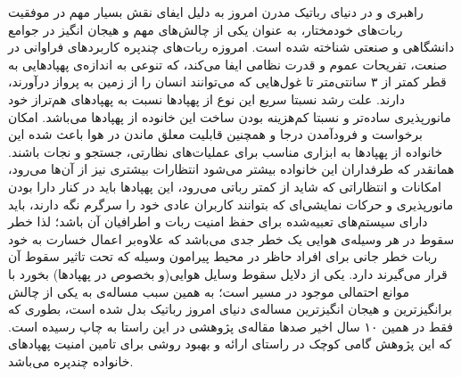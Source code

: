 راهبری و  در دنیای رباتیک مدرن امروز به دلیل ایفای نقش بسیار مهم در موفقیت ربات‌های خودمختار، به عنوان یکی از چالش‌های مهم و هیجان انگیز در جوامع دانشگاهی و صنعتی شناخته شده است. امروزه ربات‌های چندپره کاربردهای فراوانی در صنعت، تفریحات عموم و قدرت نظامی ایفا می‌کند، که تنوعی به اندازه‌ی پهپادهایی به قطر کمتر از ۳ سانتی‌متر تا غول‌هایی که می‌توانند انسان را از زمین به پرواز درآورند، دارند. علت رشد نسبتا سریع این نوع از پهپادها نسبت به پهپادهای هم‌تراز خود مانورپذیری ساده‌تر و نسبتا کم‌هزینه بودن ساخت این خانوده از پهپاد‌ها می‌باشد. امکان برخواست و فرود‌آمدن درجا و همچنین قابلیت معلق ماندن در هوا باعث شده این خانواده از پهپادها به ابزاری مناسب برای عملیات‌های نظارتی، جستجو و نجات باشند.
همانقدر که طرفداران این خانواده‌ بیشتر می‌شود انتظارات بیشتری نیز از آن‌ها می‌رود، امکانات و انتظاراتی که شاید از کمتر رباتی می‌رود، این پهپادها باید در کنار دارا بودن مانورپذیری و حرکات نمایشی‌ای که بتوانند کاربران عادی خود را سرگرم نگه دارند، باید دارای سیستم‌های تعبیه‌شده برای حفظ امنیت ربات و اطرافیان آن باشد؛ لذا خطر سقوط در هر وسیله‌ی هوایی یک خطر جدی می‌باشد که علاوه‌بر اعمال خسارت به خود ربات خطر جانی برای افراد حاظر در محیط پیرامون وسیله که تحت تاثیر سقوط آن قرار می‌گیرند دارد. یکی از دلایل سقوط وسایل هوایی(و بخصوص در پهپاد‌ها) بخورد با موانع احتمالی موجود در مسیر است؛ به همین سبب مساله‌ی  به یکی از چالش برانگیزترین و هیجان انگیزترین مساله‌ی دنیای امروز رباتیک بدل شده است، بطوری که فقط در همین ۱۰ سال اخیر صدها مقاله‌ی پژوهشی در این راستا به چاپ رسیده است. که این پژوهش گامی کوچک در راستای ارائه و بهبود روشی برای تامین امنیت پهپادهای خانواده چندپره‌ می‌باشد.